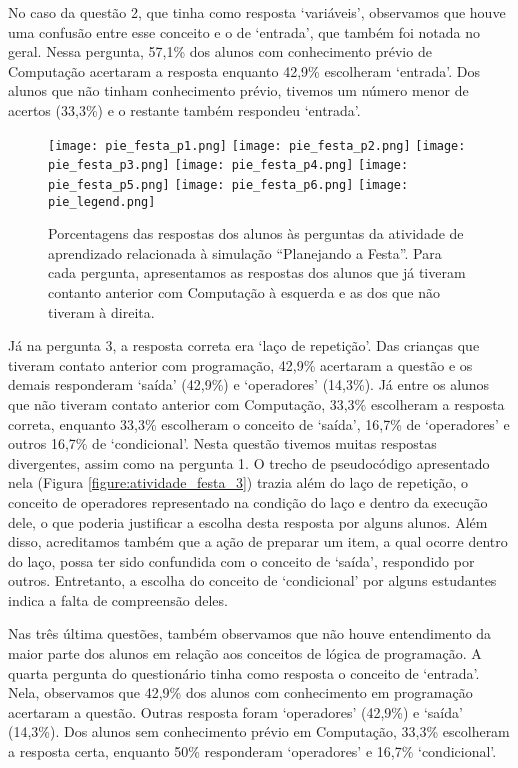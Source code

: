 No caso da questão 2, que tinha como resposta \enquote*{variáveis}, observamos que houve uma confusão entre esse conceito e o de \enquote*{entrada}, que também foi notada no geral. Nessa pergunta, 57,1\% dos alunos com conhecimento prévio de Computação acertaram a resposta enquanto 42,9\% escolheram \enquote*{entrada}. Dos alunos que não tinham conhecimento prévio, tivemos um número menor de acertos (33,3\%) e o restante também respondeu \enquote*{entrada}.

\begin{figure}[h!]
    \centering
    \texttt{[image: pie\_festa\_p1.png]}
    \texttt{[image: pie\_festa\_p2.png]}
    \texttt{[image: pie\_festa\_p3.png]}
    \texttt{[image: pie\_festa\_p4.png]}
    \texttt{[image: pie\_festa\_p5.png]}
    \texttt{[image: pie\_festa\_p6.png]}
    \texttt{[image: pie\_legend.png]}
    \caption{Porcentagens das respostas dos alunos às perguntas da atividade de aprendizado relacionada à simulação \enquote{Planejando a Festa}. Para cada pergunta, apresentamos as respostas dos alunos que já tiveram contanto anterior com Computação à esquerda e as dos que não tiveram à direita.}
    \label{figure:pies_festa}
\end{figure}

Já na pergunta 3, a resposta correta era \enquote*{laço de repetição}. Das crianças que tiveram contato anterior com programação, 42,9\% acertaram a questão e os demais responderam \enquote*{saída} (42,9\%) e \enquote*{operadores} (14,3\%). Já entre os alunos que não tiveram contato anterior com Computação, 33,3\% escolheram a resposta correta, enquanto 33,3\% escolheram o conceito de \enquote*{saída}, 16,7\% de \enquote*{operadores} e outros 16,7\% de \enquote*{condicional}. Nesta questão tivemos muitas respostas divergentes, assim como na pergunta 1. O trecho de pseudocódigo apresentado nela (Figura \ref{figure:atividade_festa_3}) trazia além do laço de repetição, o conceito de operadores representado na condição do laço e dentro da execução dele, o que poderia justificar a escolha desta resposta por alguns alunos. Além disso, acreditamos também que a ação de preparar um item, a qual ocorre dentro do laço, possa ter sido confundida com o conceito de \enquote*{saída}, respondido por outros. Entretanto, a escolha do conceito de \enquote*{condicional} por alguns estudantes indica a falta de compreensão deles.

Nas três última questões, também observamos que não houve entendimento da maior parte dos alunos em relação aos conceitos de lógica de programação. A quarta pergunta do questionário tinha como resposta o conceito de \enquote*{entrada}. Nela, observamos que 42,9\% dos alunos com conhecimento em programação acertaram a questão. Outras resposta foram \enquote*{operadores} (42,9\%) e \enquote*{saída} (14,3\%). Dos alunos sem conhecimento prévio em Computação, 33,3\% escolheram a resposta certa, enquanto 50\% responderam \enquote*{operadores} e 16,7\% \enquote*{condicional}. 

